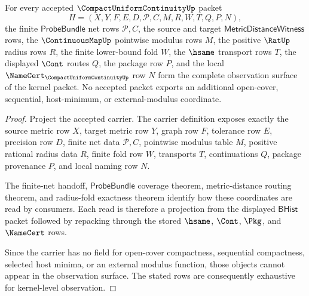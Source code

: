 \begin{theorem}
\label{thm:compact-uniform-continuity-kernel-net-observation-surface}
For every accepted $\CompactUniformContinuityUp$ packet
$$
H=(X,Y,F,E,D,\mathcal{P},C,M,R,W,T,Q,P,N),
$$
the finite $\mathsf{ProbeBundle}$ net rows $\mathcal{P},C$, the source and target $\mathsf{MetricDistanceWitness}$ rows, the $\ContinuousMapUp$ pointwise modulus rows $M$, the positive $\RatUp$ radius rows $R$, the finite lower-bound fold $W$, the $\hsame$ transport rows $T$, the displayed $\Cont$ routes $Q$, the package row $P$, and the local $\NameCert_{\CompactUniformContinuityUp}$ row $N$ form the complete observation surface of the kernel packet. No accepted packet exports an additional open-cover, sequential, host-minimum, or external-modulus coordinate.
\end{theorem}
\begin{proof}
Project the accepted carrier. The carrier definition exposes exactly the source metric row $X$, target metric row $Y$, graph row $F$, tolerance row $E$, precision row $D$, finite net data $\mathcal{P},C$, pointwise modulus table $M$, positive rational radius data $R$, finite fold row $W$, transports $T$, continuations $Q$, package provenance $P$, and local naming row $N$.

The finite-net handoff, $\mathsf{ProbeBundle}$ coverage theorem, metric-distance routing theorem, and radius-fold exactness theorem identify how these coordinates are read by consumers. Each read is therefore a projection from the displayed $\mathsf{BHist}$ packet followed by repacking through the stored $\hsame$, $\Cont$, $\Pkg$, and $\NameCert$ rows.

Since the carrier has no field for open-cover compactness, sequential compactness, selected host minima, or an external modulus function, those objects cannot appear in the observation surface. The stated rows are consequently exhaustive for kernel-level observation.
\end{proof}

